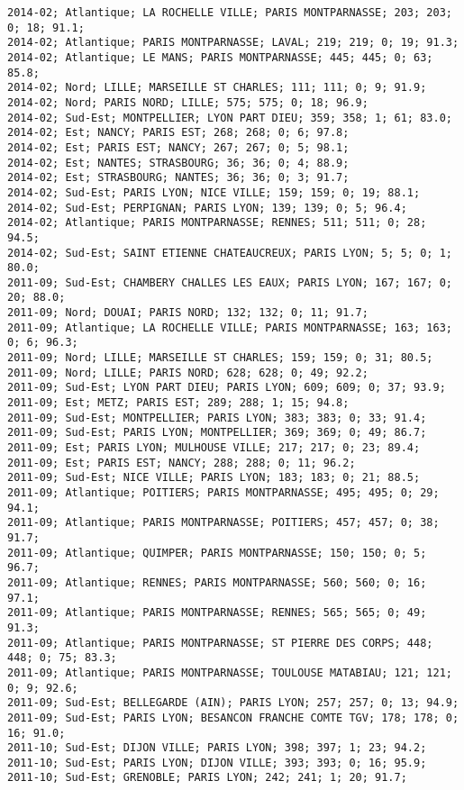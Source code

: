 \documentclass{article}
\begin{document}
\begin{Verbatim}[commandchars=\\\{\}]
2014-02; Atlantique; LA ROCHELLE VILLE; PARIS MONTPARNASSE; 203; 203; 0; 18; 91.1; 
2014-02; Atlantique; PARIS MONTPARNASSE; LAVAL; 219; 219; 0; 19; 91.3; 
2014-02; Atlantique; LE MANS; PARIS MONTPARNASSE; 445; 445; 0; 63; 85.8; 
2014-02; Nord; LILLE; MARSEILLE ST CHARLES; 111; 111; 0; 9; 91.9; 
2014-02; Nord; PARIS NORD; LILLE; 575; 575; 0; 18; 96.9; 
2014-02; Sud-Est; MONTPELLIER; LYON PART DIEU; 359; 358; 1; 61; 83.0; 
2014-02; Est; NANCY; PARIS EST; 268; 268; 0; 6; 97.8; 
2014-02; Est; PARIS EST; NANCY; 267; 267; 0; 5; 98.1; 
2014-02; Est; NANTES; STRASBOURG; 36; 36; 0; 4; 88.9; 
2014-02; Est; STRASBOURG; NANTES; 36; 36; 0; 3; 91.7; 
2014-02; Sud-Est; PARIS LYON; NICE VILLE; 159; 159; 0; 19; 88.1; 
2014-02; Sud-Est; PERPIGNAN; PARIS LYON; 139; 139; 0; 5; 96.4; 
2014-02; Atlantique; PARIS MONTPARNASSE; RENNES; 511; 511; 0; 28; 94.5; 
2014-02; Sud-Est; SAINT ETIENNE CHATEAUCREUX; PARIS LYON; 5; 5; 0; 1; 80.0; 
2011-09; Sud-Est; CHAMBERY CHALLES LES EAUX; PARIS LYON; 167; 167; 0; 20; 88.0; 
2011-09; Nord; DOUAI; PARIS NORD; 132; 132; 0; 11; 91.7; 
2011-09; Atlantique; LA ROCHELLE VILLE; PARIS MONTPARNASSE; 163; 163; 0; 6; 96.3; 
2011-09; Nord; LILLE; MARSEILLE ST CHARLES; 159; 159; 0; 31; 80.5; 
2011-09; Nord; LILLE; PARIS NORD; 628; 628; 0; 49; 92.2; 
2011-09; Sud-Est; LYON PART DIEU; PARIS LYON; 609; 609; 0; 37; 93.9; 
2011-09; Est; METZ; PARIS EST; 289; 288; 1; 15; 94.8; 
2011-09; Sud-Est; MONTPELLIER; PARIS LYON; 383; 383; 0; 33; 91.4; 
2011-09; Sud-Est; PARIS LYON; MONTPELLIER; 369; 369; 0; 49; 86.7; 
2011-09; Est; PARIS LYON; MULHOUSE VILLE; 217; 217; 0; 23; 89.4; 
2011-09; Est; PARIS EST; NANCY; 288; 288; 0; 11; 96.2; 
2011-09; Sud-Est; NICE VILLE; PARIS LYON; 183; 183; 0; 21; 88.5; 
2011-09; Atlantique; POITIERS; PARIS MONTPARNASSE; 495; 495; 0; 29; 94.1; 
2011-09; Atlantique; PARIS MONTPARNASSE; POITIERS; 457; 457; 0; 38; 91.7; 
2011-09; Atlantique; QUIMPER; PARIS MONTPARNASSE; 150; 150; 0; 5; 96.7; 
2011-09; Atlantique; RENNES; PARIS MONTPARNASSE; 560; 560; 0; 16; 97.1; 
2011-09; Atlantique; PARIS MONTPARNASSE; RENNES; 565; 565; 0; 49; 91.3; 
2011-09; Atlantique; PARIS MONTPARNASSE; ST PIERRE DES CORPS; 448; 448; 0; 75; 83.3; 
2011-09; Atlantique; PARIS MONTPARNASSE; TOULOUSE MATABIAU; 121; 121; 0; 9; 92.6; 
2011-09; Sud-Est; BELLEGARDE (AIN); PARIS LYON; 257; 257; 0; 13; 94.9; 
2011-09; Sud-Est; PARIS LYON; BESANCON FRANCHE COMTE TGV; 178; 178; 0; 16; 91.0; 
2011-10; Sud-Est; DIJON VILLE; PARIS LYON; 398; 397; 1; 23; 94.2; 
2011-10; Sud-Est; PARIS LYON; DIJON VILLE; 393; 393; 0; 16; 95.9; 
2011-10; Sud-Est; GRENOBLE; PARIS LYON; 242; 241; 1; 20; 91.7; 

\end{Verbatim}
\end{document}
